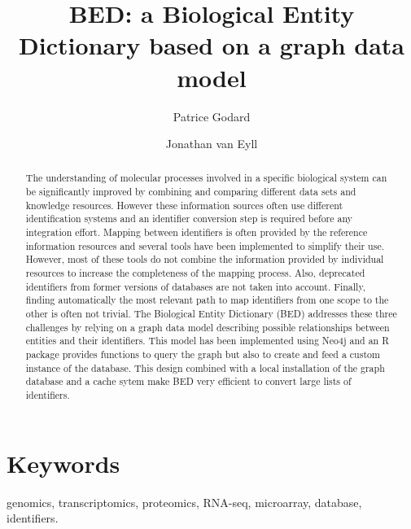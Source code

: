 \documentclass[9pt,a4paper,]{extarticle}
\theoremstyle{definition}
\theoremstyle{definition}
\theoremstyle{definition}
\theoremstyle{remark}
\begin{document}
\pagestyle{front}

\title{BED: a Biological Entity Dictionary based on a graph data model}

\author[1]{Patrice Godard}
\author[2]{Jonathan van Eyll}

\maketitle
\thispagestyle{front}

\begin{abstract}
The understanding of molecular processes involved in a specific biological system can be significantly improved by combining and comparing different data sets and knowledge resources. However these information sources often use different identification systems and an identifier conversion step is required before any integration effort. Mapping between identifiers is often provided by the reference information resources and several tools have been implemented to simplify their use. However, most of these tools do not combine the information provided by individual resources to increase the completeness of the mapping process. Also, deprecated identifiers from former versions of databases are not taken into account. Finally, finding automatically the most relevant path to map identifiers from one scope to the other is often not trivial. The Biological Entity Dictionary (BED) addresses these three challenges by relying on a graph data model describing possible relationships between entities and their identifiers. This model has been implemented using Neo4j and an R package provides functions to query the graph but also to create and feed a custom instance of the database. This design combined with a local installation of the graph database and a cache sytem make BED very efficient to convert large lists of identifiers.
\end{abstract}

\section*{Keywords}
genomics, transcriptomics, proteomics, RNA-seq, microarray, database, identifiers.


\clearpage
\pagestyle{main}
\end{document}
